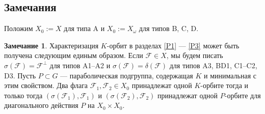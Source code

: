 \documentclass{amsart}
\theoremstyle{definition}
\newtheorem{remark}{Замечание}
\begin{document}
\subsection{Замечания}

Положим $X_0:=X$ для типа A и $X_0:=X_\omega$ для типов B, C, D.

\begin{remark}
\label{R3.4.1}
Характеризация $K$-орбит в разделах \ref{P1} --- \ref{P3} может быть получена следующим единым образом. Если $\mathcal{F}\in X$, мы будем писать
$\sigma(\mathcal{F})=\mathcal{F}^\perp$ для типов A1--A2 и
$\sigma(\mathcal{F})=\delta(\mathcal{F})$ для типов A3, BD1, C1--C2, D3. Пусть $P\subset
G$ --- параболическая подгруппа, содержащая $K$ и минимальная с этим свойством. Два флага $\mathcal{F}_1,\mathcal{F}_2\in X_0$ принадлежат одной  $K$-орбите тогда и только тогда
$(\sigma(\mathcal{F}_1),\mathcal{F}_1)$ и
$(\sigma(\mathcal{F}_2),\mathcal{F}_2)$ принадлежат одной  $P$-орбите   для диагонального действия $P$ на $X_0\times X_0$.
\end{remark}
\end{document}
